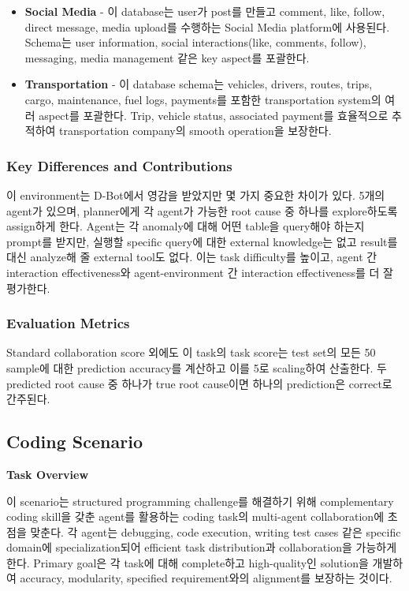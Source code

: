 \begin{itemize}
    \item \textbf{Social Media} - 이 database는 user가 post를 만들고 comment, like, follow, direct message, media upload를 수행하는 Social Media platform에 사용된다. Schema는 user information, social interactions(like, comments, follow), messaging, media management 같은 key aspect를 포괄한다.
    \item \textbf{Transportation} - 이 database schema는 vehicles, drivers, routes, trips, cargo, maintenance, fuel logs, payments를 포함한 transportation system의 여러 aspect를 포괄한다. Trip, vehicle status, associated payment를 효율적으로 추적하여 transportation company의 smooth operation을 보장한다.
\end{itemize}

\subsubsection{Key Differences and Contributions}

이 environment는 D-Bot에서 영감을 받았지만 몇 가지 중요한 차이가 있다. 5개의 agent가 있으며, planner에게 각 agent가 가능한 root cause 중 하나를 explore하도록 assign하게 한다. Agent는 각 anomaly에 대해 어떤 table을 query해야 하는지 prompt를 받지만, 실행할 specific query에 대한 external knowledge는 없고 result를 대신 analyze해 줄 external tool도 없다. 이는 task difficulty를 높이고, agent 간 interaction effectiveness와 agent-environment 간 interaction effectiveness를 더 잘 평가한다.

\subsubsection{Evaluation Metrics}

Standard collaboration score 외에도 이 task의 task score는 test set의 모든 50 sample에 대한 prediction accuracy를 계산하고 이를 5로 scaling하여 산출한다. 두 predicted root cause 중 하나가 true root cause이면 하나의 prediction은 correct로 간주된다.

\subsection{Coding Scenario}
\label{app:coding-scenario}

\textbf{Task Overview}

이 scenario는 structured programming challenge를 해결하기 위해 complementary coding skill을 갖춘 agent를 활용하는 coding task의 multi-agent collaboration에 초점을 맞춘다. 각 agent는 debugging, code execution, writing test cases 같은 specific domain에 specialization되어 efficient task distribution과 collaboration을 가능하게 한다. Primary goal은 각 task에 대해 complete하고 high-quality인 solution을 개발하여 accuracy, modularity, specified requirement와의 alignment를 보장하는 것이다.

